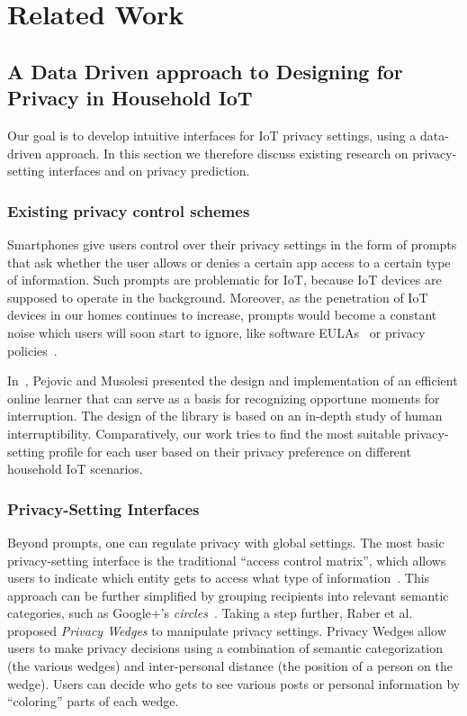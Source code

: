 \chapter{Related Work}
\section{A Data Driven approach to Designing for Privacy in Household IoT}

Our goal is to develop intuitive interfaces for IoT privacy settings, using a data-driven approach. In this section we therefore discuss existing research on privacy-setting interfaces and on privacy prediction.

\subsection{Existing privacy control schemes}
Smartphones give users control over their privacy settings in the form of prompts that ask whether the user allows or denies a certain app access to a certain type of information. Such prompts are problematic for IoT, because IoT devices are supposed to operate in the background. Moreover, as the penetration of IoT devices in our homes continues to increase, prompts would become a constant noise which users will soon start to ignore, like software EULAs~\cite{good2005spyware} or privacy policies~\cite{jensen2004privacy}.

In~\cite{Pejovic2014}, Pejovic and Musolesi presented the design and implementation of an efficient online learner that can serve as a basis for recognizing opportune moments for interruption. The design of the library is based on an in-depth study of human interruptibility. Comparatively, our work tries to find the most suitable privacy-setting profile for each user based on their privacy preference on different household IoT scenarios.

\subsection{Privacy-Setting Interfaces}
Beyond prompts, one can regulate privacy with global settings. The most basic privacy-setting interface is the traditional ``access control matrix'', which allows users to indicate which entity gets to access what type of information~\cite{sandhu1994access}. This approach can be further simplified by grouping recipients into relevant semantic categories, such as Google+'s \emph{circles}~\cite{watson12}. Taking a step further, Raber et al.~\cite{197908} proposed \emph{Privacy Wedges} to manipulate privacy settings. Privacy Wedges allow users to make privacy decisions using a combination of semantic categorization (the various wedges) and inter-personal distance (the position of a person on the wedge). Users can decide who gets to see various posts or personal information by ``coloring'' parts of each wedge. 

